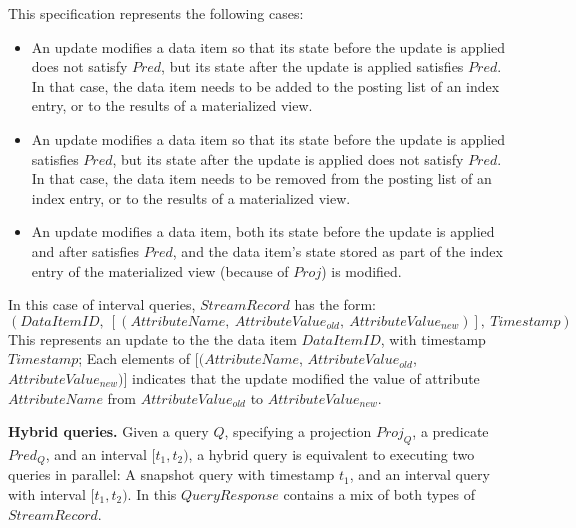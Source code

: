 \noindent
This specification represents the following cases:
\begin{itemize}

\item An update modifies a data item so that its state before the update is applied does not satisfy $Pred$,
but its state after the update is applied satisfies $Pred$.
In that case, the data item needs to be added to the posting list of an index entry, or to the results of a
materialized view.

\item An update modifies a data item so that its state before the update is applied satisfies $Pred$,
but its state after the update is applied does not satisfy $Pred$.
In that case, the data item needs to be removed from the posting list of an index entry, or to the results of a
materialized view.

\item An update modifies a data item, both its state before the update is applied and after satisfies $Pred$,
and the data item's state stored as part of the index entry of the materialized view (because of $Proj$) is modified.

\end{itemize}

In this case of interval queries, $StreamRecord$ has the form:
\[
(DataItemID,~[(AttributeName,~AttributeValue_{old},~AttributeValue_{new})],~Timestamp)
\]
This represents an update to the the data item $DataItemID$, with timestamp $Timestamp$;
Each elements of $[(AttributeName$, $AttributeValue_{old}$, $AttributeValue_{new})]$ indicates that
the update modified the value of attribute $AttributeName$ from $AttributeValue_{old}$ to $AttributeValue_{new}$.

\medskip
\noindent
\textbf{Hybrid queries.}
Given a query $Q$,
specifying a projection $Proj_Q$, a predicate $Pred_Q$, and an interval $[t_1, t_2)$,
a hybrid query is equivalent to executing two queries in parallel:
A snapshot query with timestamp $t_1$, and an interval query with interval $[t_1, t_2)$.
In this $QueryResponse$ contains a mix of both types of $StreamRecord$.


  
